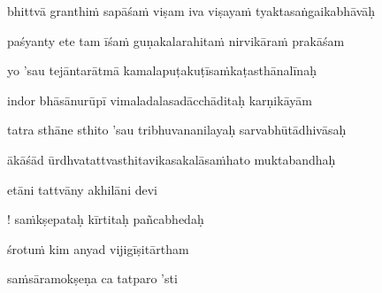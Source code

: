 \nemslokac 
bhittvā granthi\.m sapāśa\.m viṣam iva viṣaya\.m tyaktasaṅgaikabhāvāḥ
\dontdisplaylinenum

\nemslokad 
paśyanty ete tam īśa\.m guṇakalarahita\.m nirvikāra\.m prakāśam \veg\dontdisplaylinenum

\ujvers\nemsloka 
yo 'sau tejāntarātmā kamalapuṭakuṭīsa\.mkaṭasthānalīnaḥ
\dontdisplaylinenum

\nemslokab 
indor bhāsānurūpī vimaladalasadācchāditaḥ karṇikāyām \danda\dontdisplaylinenum

\nemslokac 
tatra sthāne sthito 'sau tribhuvananilayaḥ sarvabhūtādhivāsaḥ
\dontdisplaylinenum

\nemslokad 
ākāśād ūrdhvatattvasthitavikasakalāsa\.mhato muktabandhaḥ \veg\dontdisplaylinenum

\nemslokanormal


\ujvers\nemsloka 
etāni tattvāny akhilāni devi
\dontdisplaylinenum

\nemslokab 
! sa\.mkṣepataḥ kīrtitaḥ pañcabhedaḥ \danda\dontdisplaylinenum

\nemslokac 
śrotu\.m kim anyad vijigīṣitārtham
\dontdisplaylinenum

\nemslokad 
sa\.msāramokṣeṇa ca tatparo 'sti \veg\dontdisplaylinenum

